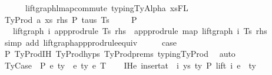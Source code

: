 \begin{isabellebody}
\ \ \ \ \ \ lift{\isacharunderscore}{\kern0pt}graph{\isacharunderscore}{\kern0pt}lmap{\isacharunderscore}{\kern0pt}commute\ typing{\isachardot}{\kern0pt}TyAlpha\ xs{\isacharunderscore}{\kern0pt}FL{\isacharparenright}{\kern0pt}\isanewline
{}\isamarkupfalse%
\isanewline
\ \ \isamarkupfalse%
\ {\isacharparenleft}{\kern0pt}TyProd\ a\ xs\ rhs\ P\ taus\ Ts\ {\isasymGamma}{\isacharparenright}{\kern0pt}\isanewline
\isanewline
\ \ \isamarkupfalse%
\ P{}{\isacharcolon}{\kern0pt}\isanewline
\ \ \ {\isachardoublequoteopen}lift{\isacharunderscore}{\kern0pt}graph\ i\ {\isacharparenleft}{\kern0pt}app{\isacharunderscore}{\kern0pt}prodrule\ Ts\ rhs{\isacharparenright}{\kern0pt}\ {\isacharequal}{\kern0pt}\ app{\isacharunderscore}{\kern0pt}prodrule\ {\isacharparenleft}{\kern0pt}map\ {\isacharparenleft}{\kern0pt}lift{\isacharunderscore}{\kern0pt}graph\ i{\isacharparenright}{\kern0pt}\ Ts{\isacharparenright}{\kern0pt}\ rhs{\isachardoublequoteclose}\isanewline
\ \ \ \ \isamarkupfalse%
\ {\isacharparenleft}{\kern0pt}simp\ add{\isacharcolon}{\kern0pt}\ lift{\isacharunderscore}{\kern0pt}graph{\isacharunderscore}{\kern0pt}app{\isacharunderscore}{\kern0pt}prodrule{\isacharunderscore}{\kern0pt}equiv{\isacharparenright}{\kern0pt}\isanewline
\isanewline
\ \ \isamarkupfalse%
\ \isamarkupfalse%
\ {\isacharquery}{\kern0pt}case\isanewline
\ \ \ \ \isamarkupfalse%
\ P{}\ TyProd{\isachardot}{\kern0pt}IH\ TyProd{\isachardot}{\kern0pt}hyps{\isacharparenleft}{\kern0pt}{}{\isacharcomma}{\kern0pt}{}{\isacharcomma}{\kern0pt}{}{\isacharcomma}{\kern0pt}{}{\isacharparenright}{\kern0pt}\ TyProd{\isachardot}{\kern0pt}prems\ typing{\isachardot}{\kern0pt}TyProd\ \isamarkupfalse%
\ auto\isanewline
{}\isamarkupfalse%
\isanewline
\ \ \isamarkupfalse%
\ {\isacharparenleft}{\kern0pt}TyCase\ {\isasymGamma}\ P\ e{}\ ty{}\ {\isasymGamma}{}\ e{}\ ty{}{\isacharprime}{\kern0pt}\ e{}\ T{\isacharparenright}{\kern0pt}\isanewline
\ \ \isamarkupfalse%
\ IHe{}{\isacharcolon}{\kern0pt}\ {\isachardoublequoteopen}insert{\isacharunderscore}{\kern0pt}at\ {\isasymGamma}\ i\ {\isacharparenleft}{\kern0pt}ys{\isacharcomma}{\kern0pt}\ ty{}{\isacharparenright}{\kern0pt}\ {\isasymturnstile}{\isacharbraceleft}{\kern0pt}P{\isacharbraceright}{\kern0pt}\ lift\ i\ e{}\ {\isacharcolon}{\kern0pt}\ ty{}{\isachardoublequoteclose}\isanewline

\end{isabellebody}
